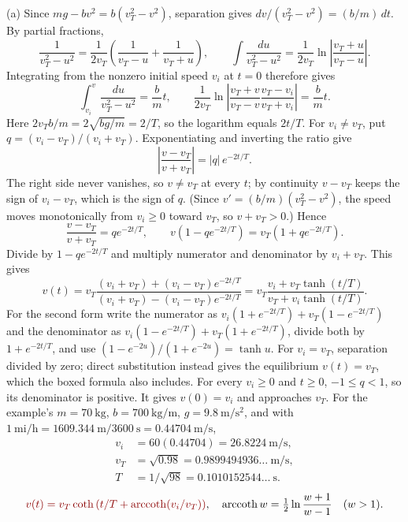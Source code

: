 (a) Since $mg-bv^2=b(v_T^2-v^2)$, separation gives
$dv/(v_T^2-v^2)=(b/m)\,dt$. By partial fractions,
\[
\frac1{v_T^2-u^2}=\frac1{2v_T}\left(\frac1{v_T-u}+\frac1{v_T+u}\right),
\qquad
\int\frac{du}{v_T^2-u^2}=\frac1{2v_T}\ln\left|\frac{v_T+u}{v_T-u}\right|.
\]
Integrating from the nonzero initial speed $v_i$ at $t=0$ therefore gives
\[
\int_{v_i}^{v}\frac{du}{v_T^2-u^2}=\frac bm t,
\qquad
\frac1{2v_T}\ln\left|\frac{v_T+v}{v_T-v}
                         \frac{v_T-v_i}{v_T+v_i}\right|=\frac bm t.
\]
Here $2v_Tb/m=2\sqrt{bg/m}=2/T$, so the logarithm equals $2t/T$.
For $v_i\ne v_T$, put $q=(v_i-v_T)/(v_i+v_T)$. Exponentiating and
inverting the ratio give
\[
\left|\frac{v-v_T}{v+v_T}\right|=|q|\,e^{-2t/T}.
\]
The right side never vanishes, so $v\ne v_T$ at every $t$; by continuity
$v-v_T$ keeps the sign of $v_i-v_T$, which is the sign of $q$. (Since
$v'=(b/m)(v_T^2-v^2)$, the speed moves monotonically from $v_i\ge0$
toward $v_T$, so $v+v_T>0$.) Hence
\[
\frac{v-v_T}{v+v_T}=q e^{-2t/T},\qquad
v(1-qe^{-2t/T})=v_T(1+qe^{-2t/T}).
\]
Divide by $1-qe^{-2t/T}$ and multiply numerator and denominator by
$v_i+v_T$. This gives
\[
\boxed{v(t)=v_T
\frac{(v_i+v_T)+(v_i-v_T)e^{-2t/T}}
     {(v_i+v_T)-(v_i-v_T)e^{-2t/T}}}
=v_T\frac{v_i+v_T\tanh(t/T)}{v_T+v_i\tanh(t/T)}.
\]
For the second form write the numerator as
$v_i(1+e^{-2t/T})+v_T(1-e^{-2t/T})$ and the denominator as
$v_i(1-e^{-2t/T})+v_T(1+e^{-2t/T})$, divide both by $1+e^{-2t/T}$, and
use $(1-e^{-2u})/(1+e^{-2u})=\tanh u$.
For $v_i=v_T$, separation divided by zero; direct substitution instead
gives the equilibrium $v(t)=v_T$, which the boxed formula also includes.
For every $v_i\ge0$ and $t\ge0$, $-1\le q<1$, so its denominator is
positive. It gives $v(0)=v_i$ and approaches $v_T$. For the example's
$m=70\ \mathrm{kg}$, $b=700\ \mathrm{kg/m}$, $g=9.8\ \mathrm{m/s^2}$,
and with $1\ \mathrm{mi/h}=1609.344\ \mathrm m/3600\ \mathrm s
=0.44704\ \mathrm{m/s}$,
\[
\begin{aligned}
v_i&=60(0.44704)=26.8224\ \mathrm{m/s},\\
v_T&=\sqrt{0.98}=0.9899494936\ldots\ \mathrm{m/s},\\
T&=1/\sqrt{98}=0.1010152544\ldots\ \mathrm s.
\end{aligned}
\]
\[
\erratum{v(t)=v_T\coth\left(t/T+\operatorname{arccoth}(v_i/v_T)\right)},
\quad \operatorname{arccoth}w=\tfrac12\ln\frac{w+1}{w-1}\quad(w>1).
\]
